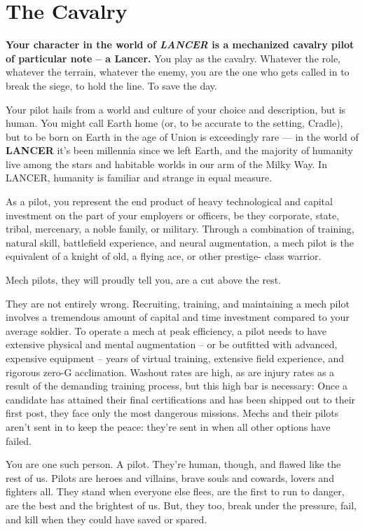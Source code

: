 \section{The Cavalry}

\textbf{Your character in the world of \textit{LANCER} is a mechanized cavalry pilot of particular note -- a
Lancer.} You play as the cavalry. Whatever the role, whatever the terrain, whatever the enemy,
you are the one who gets called in to break the siege, to hold the line. To save the day.

Your pilot hails from a world and culture of your choice and description, but is human. You might
call Earth home (or, to be accurate to the setting, Cradle), but to be born on Earth in the age of
Union is exceedingly rare — in the world of \textbf{LANCER} it’s been millennia since we left Earth, and
the majority of humanity live among the stars and habitable worlds in our arm of the Milky Way.
In LANCER, humanity is familiar and strange in equal measure.

As a pilot, you represent the end product of heavy technological and capital investment on the
part of your employers or officers, be they corporate, state, tribal, mercenary, a noble family, or
military. Through a combination of training, natural skill, battlefield experience, and neural
augmentation, a mech pilot is the equivalent of a knight of old, a flying ace, or other prestige-
class warrior.

Mech pilots, they will proudly tell you, are a cut above the rest.

They are not entirely wrong. Recruiting, training, and maintaining a mech pilot involves a
tremendous amount of capital and time investment compared to your average soldier. To operate
a mech at peak efficiency, a pilot needs to have extensive physical and mental augmentation --
or be outfitted with advanced, expensive equipment -- years of virtual training, extensive field
experience, and rigorous zero-G acclimation. Washout rates are high, as are injury rates as a
result of the demanding training process, but this high bar is necessary: Once a candidate has
attained their final certifications and has been shipped out to their first post, they face only the
most dangerous missions. Mechs and their pilots aren’t sent in to keep the peace: they’re sent in
when all other options have failed.

You are one such person. A pilot. They’re human, though, and flawed like the rest of us. Pilots
are heroes and villains, brave souls and cowards, lovers and fighters all. They stand when
everyone else flees, are the first to run to danger, are the best and the brightest of us. But, they
too, break under the pressure, fail, and kill when they could have saved or spared.


